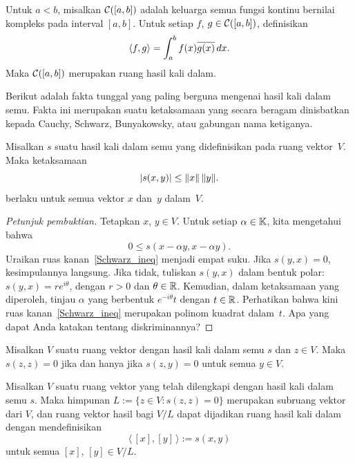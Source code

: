\begin{exam}\label{000150014} Untuk $a < b$, misalkan $\mathcal{C}([a,b])$ adalah keluarga semua
fungsi kontinu bernilai kompleks pada interval $[a,b]$. Untuk setiap $f$, $g \in \mathcal{C}([a,b])$, definisikan
   \[ \langle f,g \rangle = \int_a^b f(x) \overline{g(x)}\,dx. \]
Maka $\mathcal{C}([a,b])$ merupakan ruang hasil kali dalam.
\end{exam}

Berikut adalah fakta tunggal yang paling berguna mengenai hasil kali dalam semu. Fakta ini merupakan suatu ketaksamaan yang secara beragam
dinisbatkan kepada Cauchy, Schwarz, Bunyakowsky, atau gabungan nama ketiganya.

\begin{thm}\label{00015002} Misalkan $s$ suatu hasil kali dalam semu yang didefinisikan pada ruang vektor~$V$.
Maka ketaksamaan
   \[ \lvert s(x,y)\rvert \le \lVert x\rVert \,\lVert y\rVert. \]
berlaku untuk semua vektor $x$ dan~$y$ dalam~$V$.
\end{thm}

\begin{proof}[\emph{Petunjuk pembuktian}] Tetapkan $x$, $y \in V$. Untuk setiap $\alpha \in \mathbb{K}$, kita mengetahui bahwa
  \begin{equation}\label{Schwarz_ineq}
      0 \le s(x - \alpha y, x - \alpha y) .
  \end{equation}
Uraikan ruas kanan~\eqref{Schwarz_ineq} menjadi empat suku. Jika $s(y,x)=0$, kesimpulannya langsung. Jika tidak,
tuliskan $s(y,x)$ dalam bentuk polar: $s(y,x) = r e^{i\theta}$, dengan $r > 0$ dan $\theta \in \mathbb{R}$.
Kemudian, dalam ketaksamaan yang diperoleh, tinjau $\alpha$ yang berbentuk $e^{-i\theta}t$ dengan
$t \in \mathbb{R}$. Perhatikan bahwa kini ruas kanan~\eqref{Schwarz_ineq} merupakan polinom kuadrat dalam~$t$. Apa yang dapat Anda katakan tentang
diskriminannya? \ns
\end{proof}

\begin{prop} Misalkan $V$ suatu ruang vektor dengan hasil kali dalam semu $s$ dan $z \in V$. Maka $s(z,z) = 0$
jika dan hanya jika $s(z,y) = 0$ untuk semua $y \in V$.
\end{prop}

\begin{prop} Misalkan $V$ suatu ruang vektor yang telah dilengkapi dengan hasil kali dalam semu $s$. Maka himpunan
$L := \{z \in V\colon s(z,z) = 0\}$ merupakan subruang vektor dari $V$, dan ruang vektor hasil bagi $V/L$ dapat
dijadikan ruang hasil kali dalam dengan mendefinisikan
    \[ \langle\, [x],[y]\, \rangle := s(x,y) \]
untuk semua $[x]$, $[y] \in V/L$.
\end{prop}

